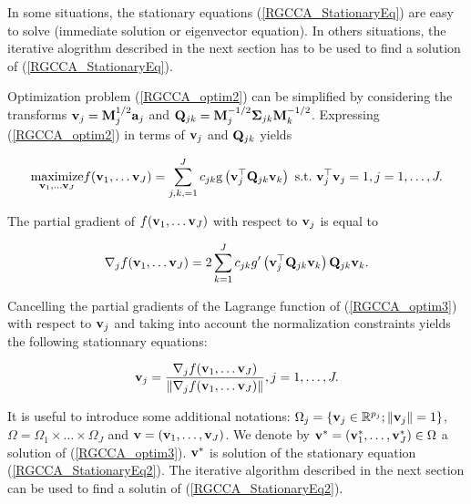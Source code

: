 \documentclass[
]{jss}
\begin{document}
In some situations, the stationary equations (\ref{RGCCA_StationaryEq})
are easy to solve (immediate solution or eigenvector equation). In
others situations, the iterative alogrithm described in the next section
has to be used to find a solution of (\ref{RGCCA_StationaryEq}).

Optimization problem (\ref{RGCCA_optim2}) can be simplified by
considering the transforms \(\mathbf{v}_j = \mathbf{M}_j^{1/2}\mathbf{a}_j\) and
\(\mathbf{Q}_{jk} = \mathbf{M}_j^{-1/2} \mathbf{\Sigma}_{jk} \mathbf{M}_k^{-1/2}\).
Expressing (\ref{RGCCA_optim2}) in terms of \(\mathbf{v}_j\) and
\(\mathbf{Q}_{jk}\) yields

\begin{equation}
\underset{\mathbf{v}_1, \ldots \mathbf{v}_J}{\text{maximize}} f(\mathbf{v}_1, \ldots \mathbf{v}_J) = \sum_{j,k,=1}^J c_{jk} \text{g}\left(\mathbf{v}_j^\top \mathbf{Q}_{jk} \mathbf{v}_k\right) \text{~s.t.~} \mathbf{v}_j^\top \mathbf{v}_j = 1,  j=1, \ldots, J.
\label{RGCCA_optim3}
\end{equation}

The partial gradient of \(f(\mathbf{v}_1, \ldots \mathbf{v}_J)\) with respect to
\(\mathbf{v}_j\) is equal to

\begin{equation}
\mathbf{\nabla}_j f(\mathbf{v}_1, \ldots \mathbf{v}_J)=2\sum_{k=1}^{J}c_{jk}g'\left(\mathbf{v}_j^\top \mathbf{Q}_{jk} \mathbf{v}_k \right) \mathbf{Q}_{jk} \mathbf{v}_k.
\label{RGCCA_nabla}
\end{equation}

Cancelling the partial gradients of the Lagrange function of
(\ref{RGCCA_optim3}) with respect to \(\mathbf{v}_j\) and taking into account
the normalization constraints yields the following stationnary
equations:

\begin{equation}
\mathbf{v}_j = \frac{\mathbf{\nabla}_j f(\mathbf{v}_1, \ldots \mathbf{v}_J)}{\Vert \mathbf{\nabla}_j f(\mathbf{v}_1, \ldots \mathbf{v}_J) \Vert}, j=1, \ldots, J.
\label{RGCCA_StationaryEq2}
\end{equation}

\begin{sloppypar}
It is useful to introduce some additional notations: 
$\Omega_j = \lbrace \mathbf{v}_j \in \mathbb{R}^{p_j} ; \Vert \mathbf{v}_j \Vert = 1 \rbrace$, 
$\Omega = \Omega_1 \times \ldots \times \Omega_J$ and 
$\mathbf{v} = \left(\mathbf{v}_1 , \ldots , \mathbf{v}_J \right)$. We denote by 
$\mathbf{v}^* = \left(\mathbf{v}_1^*, \ldots, \mathbf{v}_J^* \right) \in \Omega$ a solution of 
(\ref{RGCCA_optim3}). $\mathbf{v}^*$ is solution of the stationary equation 
(\ref{RGCCA_StationaryEq2}). The iterative algorithm described in the next 
section can be used to find a solutin of (\ref{RGCCA_StationaryEq2}).
\end{sloppypar}
\end{document}
